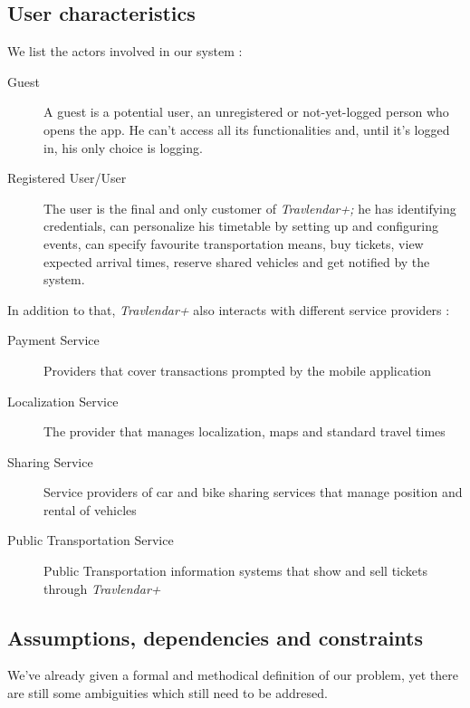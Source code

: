 			
\subsection{User characteristics}
	We list the actors involved in our system :
	\begin{description}
		\item[Guest] A guest is a potential user, an unregistered or not-yet-logged person who opens the app. He can't access all its functionalities and, until it's logged in, his only choice is logging.
		\item[Registered User/User] The user is the final and only customer of \textit{Travlendar+;} he has identifying credentials, can personalize his timetable by setting up and configuring events, can specify favourite transportation means, buy tickets, view expected arrival times, reserve shared vehicles and get notified by the system.

	\end{description}
	In addition to that, \textit{Travlendar+} also interacts with different service providers :
	\begin{description}
		\item[Payment Service] Providers that cover transactions prompted by the mobile application
		\item[Localization Service] The provider that manages localization, maps and standard travel times 
		\item[Sharing Service] Service providers of car and bike sharing services that manage position and rental of vehicles
		\item[Public Transportation Service] Public Transportation information systems that show and sell tickets through \textit{Travlendar+}
	\end{description}

\subsection{Assumptions, dependencies and constraints}

We've already given a formal and methodical definition of our problem, yet there are still some ambiguities which still need to be addresed.


